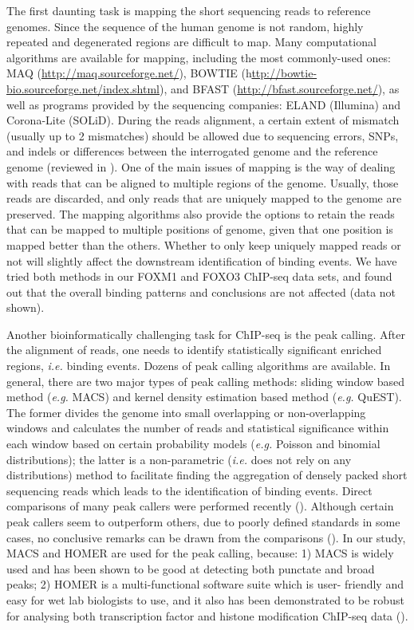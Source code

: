 The first daunting task is mapping the short sequencing reads to reference genomes. Since the sequence of the human genome is not random, highly repeated and degenerated regions are difficult to map. Many computational algorithms are available for mapping, including the most commonly-used ones: MAQ (\url{http://maq.sourceforge.net/}), BOWTIE (h\url{ttp://bowtie-bio.sourceforge.net/index.shtml}), and BFAST (\url{http://bfast.sourceforge.net/}), as well as programs provided by the sequencing companies: ELAND (Illumina) and Corona-Lite (SOLiD). During the reads alignment, a certain extent of mismatch (usually up to 2 mismatches) should be allowed due to sequencing errors, SNPs, and indels or differences between the interrogated genome and the reference genome (reviewed in \cite{park2009chip-seq:}). One of the main issues of mapping is the way of dealing with reads that can be aligned to multiple regions of the genome. Usually, those reads are discarded, and only reads that are uniquely mapped to the genome are preserved. The mapping algorithms also provide the options to retain the reads that can be mapped to multiple positions of genome, given that one position is mapped better than the others. Whether to only keep uniquely mapped reads or not will slightly affect the downstream identification of binding events. We have tried both methods in our FOXM1 and FOXO3 ChIP-seq data sets, and found out that the overall binding patterns and conclusions are not affected (data not shown).

Another bioinformatically challenging task for ChIP-seq is the peak calling. After the alignment of reads, one needs to identify statistically significant enriched regions, \textit{i.e.} binding events. Dozens of peak calling algorithms are available. In general, there are two major types of peak calling methods: sliding window based method (\textit{e.g.} MACS) and kernel density estimation based method (\textit{e.g.} QuEST). The former divides the genome into small overlapping or non-overlapping windows and calculates the number of reads and statistical significance within each window based on certain probability models (\textit{e.g.} Poisson and binomial distributions); the latter is a non-parametric (\textit{i.e.} does not rely on any distributions) method to facilitate finding the aggregation of densely packed short sequencing reads which leads to the identification of binding events. Direct comparisons of many peak callers were performed recently (\cite{wilbanks2010evaluation,feng2011peakranger:}). Although certain peak callers seem to outperform others, due to poorly defined standards in some cases, no conclusive remarks can be drawn from the comparisons (\cite{wilbanks2010evaluation}). In our study, MACS and HOMER are used for the peak calling, because: 1) MACS is widely used and has been shown to be good at detecting both punctate and broad peaks; 2) HOMER is a multi-functional software suite which is user- friendly and easy for wet lab biologists to use, and it also has been demonstrated to be robust for analysing both transcription factor and histone modification ChIP-seq data (\cite{heinz2010simple,lin2010a,wang2011reprogramming}).

